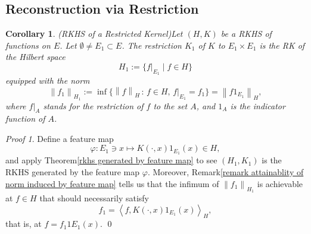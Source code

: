 \documentclass[a4paper,12pt]{article}
\newtheorem{cor}[thm]{Corollary}
\theoremstyle{remark}
\newtheorem*{prf}{Proof}
\theoremstyle{definition}
\theoremstyle{definition}
\theoremstyle{definition}
\newcommand{\ip}[2]{\left<#1, #2 \right>}
\newcommand{\norm}[1]{\left\| #1 \right\|}
\begin{document}
\subsection{Reconstruction via Restriction}
\begin{cor} (RKHS of a Restricted Kernel)\label{rkhs of restricted kernel}
	Let \( (H,K) \) be a RKHS of functions on \( E \). Let \( \emptyset \neq E_1 \subset E \). The restriction \( K_1 \) of \( K \) to \( E_1 \times E_1 \) is the RK of the Hilbert space
	\begin{equation*}
		H_1 := \{f|_{E_1} \mid f \in H \}
	\end{equation*}
	equipped with the norm
	\begin{equation*}
		\norm{f_1}_{H_1} := \inf \{\norm{f}_{H} \,:\, f \in H ,\, f|_{E_1} = f_1\} = \norm{f 1_{E_1}}_H,
	\end{equation*}
	where \( f|_{A} \) stands for the restriction of \( f \) to the set \( A \), and \( 1_A \) is the indicator function of \( A \).
\end{cor}
\begin{prf}
	Define a feature map
	\begin{equation*}
		\varphi: E_1 \ni x \mapsto K(\cdot ,x)1_{E_1}(x) \in H,
	\end{equation*}
	and apply Theorem\ref{rkhs generated by feature map} to see \( (H_1, K_1) \) is the RKHS generated by the feature map \( \varphi \). Moreover, Remark\ref{remark attainablity of norm induced by feature map} tells us that the infimum of \( \norm{f_1}_{H_1} \) is achievable at \( f \in H \) that should necessarily satisfy
	\begin{equation*}
		f_1 = \ip{f}{K(\cdot ,x)1_{E_1}(x)}_{H},
	\end{equation*}
	that is, at \( f = f_1 1{E_1}(x) \).
	\qed\end{prf}
\end{document}
